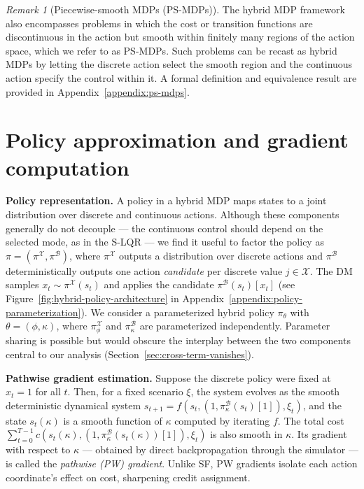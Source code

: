 \documentclass{article}
\theoremstyle{definition}
\theoremstyle{remark}
\newtheorem{remark}{Remark}
\begin{document}
\begin{remark}[Piecewise-smooth MDPs (PS-MDPs)]
The hybrid MDP framework also encompasses problems in which the cost or transition functions are discontinuous in the action but smooth within finitely many regions of the action space, which we refer to as PS-MDPs. Such problems can be recast as hybrid MDPs by letting the discrete action select the smooth region and the continuous action specify the control within it. A formal definition and equivalence result are provided in Appendix~\ref{appendix:ps-mdps}.
\end{remark}

\section{Policy approximation and gradient computation \label{sec:policy-and-gradient}}

{\bf Policy representation.}
A policy in a hybrid MDP maps states to a joint distribution over discrete and continuous 
actions. Although these components generally do not decouple --- the continuous control 
should depend on the selected mode, as in the S-LQR --- we find it useful to factor the 
policy as $\pi = (\pi^{\mathcal{X}}, \pi^{\mathcal{B}})$, where $\pi^{\mathcal{X}}$ 
outputs a distribution over discrete actions and $\pi^{\mathcal{B}}$ deterministically 
outputs one action \emph{candidate} per discrete value $j \in \mathcal{X}$. The DM samples $x_t \sim \pi^{\mathcal{X}}(s_t)$ and applies the candidate $\pi^{\mathcal{B}}(s_t)[x_t]$ (see Figure~\ref{fig:hybrid-policy-architecture} 
in Appendix~\ref{appendix:policy-parameterization}).
We consider a parameterized hybrid policy $\pi_\theta$ with $\theta = (\phi, \kappa)$, 
where $\pi^{\mathcal{X}}_\phi$ and $\pi^{\mathcal{B}}_\kappa$ are parameterized 
independently. Parameter sharing is possible but would obscure the interplay between 
the two components central to our analysis (Section~\ref{sec:cross-term-vanishes}).


{\bf Pathwise gradient estimation.}
Suppose the discrete policy were fixed at $x_t = 1$ for all $t$. Then, for a fixed 
scenario $\xi$, the system evolves as the smooth deterministic dynamical system 
$s_{t+1} = f(s_t, (1, \pi^{\mathcal{B}}_{\kappa}(s_t)[1]), \xi_t)$, and the state 
$s_t(\kappa)$ is a smooth function of $\kappa$ computed by iterating $f$. The total cost 
$\sum_{t=0}^{T-1} c(s_t(\kappa), (1, \pi^{\mathcal{B}}_{\kappa}(s_t(\kappa))[1]), \xi_t)$ 
is also smooth in $\kappa$. Its gradient with respect to $\kappa$ --- obtained by 
direct backpropagation through the simulator --- is called the \emph{pathwise (PW) gradient}. Unlike SF, PW gradients isolate each action coordinate's effect on cost, sharpening credit assignment. 
\end{document}
